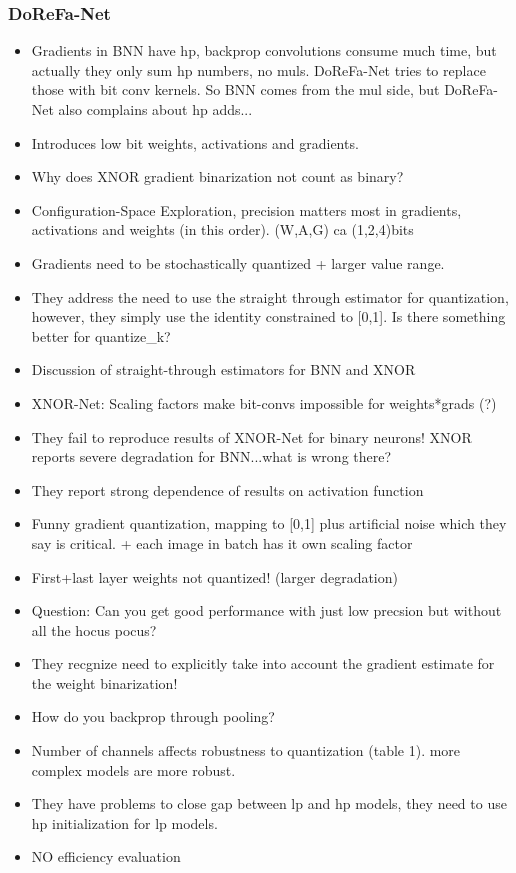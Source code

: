 \documentclass{article}
\begin{document}
\subsubsection*{DoReFa-Net}
\begin{itemize}
    \item Gradients in BNN have hp, backprop convolutions consume much time, but actually
    they only sum hp numbers, no muls. DoReFa-Net tries to replace those with bit conv
    kernels. So BNN comes from the mul side, but DoReFa-Net also complains about
    hp adds...
    \item Introduces low bit weights, activations and gradients.
    \item Why does XNOR gradient binarization not count as binary?
    \item Configuration-Space Exploration, precision matters most in gradients,
    activations and weights (in this order). (W,A,G) ca (1,2,4)bits
    \item Gradients need to be stochastically quantized + larger value range.
    \item They address the need to use the straight through estimator for quantization,
    however, they simply use the identity constrained to [0,1]. Is there something
    better for quantize\_k?
    \item Discussion of straight-through estimators for BNN and XNOR
    \item XNOR-Net: Scaling factors make bit-convs impossible for weights*grads (?)
    \item They fail to reproduce results of XNOR-Net for binary neurons! XNOR reports
    severe degradation for BNN...what is wrong there?
    \item They report strong dependence of results on activation function
    \item Funny gradient quantization, mapping to [0,1] plus artificial noise which
    they say is critical. + each image in batch has it own scaling factor
    \item First+last layer weights not quantized! (larger degradation)
    \item Question: Can you get good performance with just low precsion but 
    without all the hocus pocus?
    \item They recgnize need to explicitly take into account the gradient estimate
    for the weight binarization!
    \item How do you backprop through pooling?
    \item Number of channels affects robustness to quantization (table 1). more 
    complex models are more robust.
    \item They have problems to close gap between lp and hp models, they need to
    use hp initialization for lp models.
    \item NO efficiency evaluation
\end{itemize}
\end{document}

